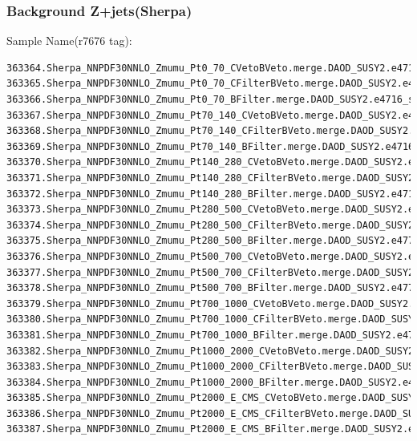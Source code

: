 \documentclass[mathserif,serif]{beamer}
\begin{document}
\begin{frame}[fragile]
\frametitle{Background Z+jets(Sherpa)}
\small
Sample Name(r7676 tag):
\tiny
\begin{verbatim}
363364.Sherpa_NNPDF30NNLO_Zmumu_Pt0_70_CVetoBVeto.merge.DAOD_SUSY2.e4716_s2726_r7725_r7676_p2666/
363365.Sherpa_NNPDF30NNLO_Zmumu_Pt0_70_CFilterBVeto.merge.DAOD_SUSY2.e4716_s2726_r7725_r7676_p2666/
363366.Sherpa_NNPDF30NNLO_Zmumu_Pt0_70_BFilter.merge.DAOD_SUSY2.e4716_s2726_r7725_r7676_p2666/
363367.Sherpa_NNPDF30NNLO_Zmumu_Pt70_140_CVetoBVeto.merge.DAOD_SUSY2.e4716_s2726_r7725_r7676_p2666/
363368.Sherpa_NNPDF30NNLO_Zmumu_Pt70_140_CFilterBVeto.merge.DAOD_SUSY2.e4716_s2726_r7725_r7676_p2666/
363369.Sherpa_NNPDF30NNLO_Zmumu_Pt70_140_BFilter.merge.DAOD_SUSY2.e4716_s2726_r7725_r7676_p2666/
363370.Sherpa_NNPDF30NNLO_Zmumu_Pt140_280_CVetoBVeto.merge.DAOD_SUSY2.e4716_s2726_r7725_r7676_p2666/
363371.Sherpa_NNPDF30NNLO_Zmumu_Pt140_280_CFilterBVeto.merge.DAOD_SUSY2.e4716_s2726_r7725_r7676_p2666/
363372.Sherpa_NNPDF30NNLO_Zmumu_Pt140_280_BFilter.merge.DAOD_SUSY2.e4716_s2726_r7725_r7676_p2666/
363373.Sherpa_NNPDF30NNLO_Zmumu_Pt280_500_CVetoBVeto.merge.DAOD_SUSY2.e4716_s2726_r7725_r7676_p2666/
363374.Sherpa_NNPDF30NNLO_Zmumu_Pt280_500_CFilterBVeto.merge.DAOD_SUSY2.e4716_s2726_r7725_r7676_p2666/
363375.Sherpa_NNPDF30NNLO_Zmumu_Pt280_500_BFilter.merge.DAOD_SUSY2.e4772_s2726_r7725_r7676_p2666/
363376.Sherpa_NNPDF30NNLO_Zmumu_Pt500_700_CVetoBVeto.merge.DAOD_SUSY2.e4716_s2726_r7725_r7676_p2666/
363377.Sherpa_NNPDF30NNLO_Zmumu_Pt500_700_CFilterBVeto.merge.DAOD_SUSY2.e4716_s2726_r7725_r7676_p2666/
363378.Sherpa_NNPDF30NNLO_Zmumu_Pt500_700_BFilter.merge.DAOD_SUSY2.e4772_s2726_r7725_r7676_p2666/
363379.Sherpa_NNPDF30NNLO_Zmumu_Pt700_1000_CVetoBVeto.merge.DAOD_SUSY2.e4716_s2726_r7725_r7676_p2666/
363380.Sherpa_NNPDF30NNLO_Zmumu_Pt700_1000_CFilterBVeto.merge.DAOD_SUSY2.e4716_s2726_r7725_r7676_p2666/
363381.Sherpa_NNPDF30NNLO_Zmumu_Pt700_1000_BFilter.merge.DAOD_SUSY2.e4716_s2726_r7725_r7676_p2666/
363382.Sherpa_NNPDF30NNLO_Zmumu_Pt1000_2000_CVetoBVeto.merge.DAOD_SUSY2.e4716_s2726_r7725_r7676_p2666/
363383.Sherpa_NNPDF30NNLO_Zmumu_Pt1000_2000_CFilterBVeto.merge.DAOD_SUSY2.e4716_s2726_r7725_r7676_p2666/
363384.Sherpa_NNPDF30NNLO_Zmumu_Pt1000_2000_BFilter.merge.DAOD_SUSY2.e4716_s2726_r7725_r7676_p2666/
363385.Sherpa_NNPDF30NNLO_Zmumu_Pt2000_E_CMS_CVetoBVeto.merge.DAOD_SUSY2.e4716_s2726_r7725_r7676_p2666/
363386.Sherpa_NNPDF30NNLO_Zmumu_Pt2000_E_CMS_CFilterBVeto.merge.DAOD_SUSY2.e4716_s2726_r7725_r7676_p2666/
363387.Sherpa_NNPDF30NNLO_Zmumu_Pt2000_E_CMS_BFilter.merge.DAOD_SUSY2.e4716_s2726_r7725_r7676_p2666/
\end{verbatim}
\end{frame}
\end{document}
